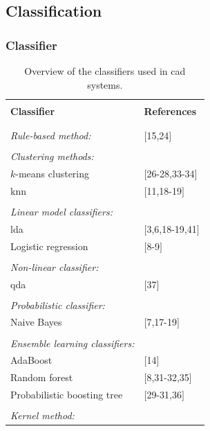 \subsection{Classification} \label{subsec:classification}

\subsubsection{Classifier}

\begin{table}
	\caption{Overview of the classifiers used in \ac{cad} systems.}
	\small
	\begin{tabular}{p{.60\linewidth} p{.30\linewidth}}
		\hline \\ [-1.5ex]
		\textbf{Classifier} & \textbf{References} \\ \\ [-1.5ex]
		\hline \\ [-1.5ex]
		\textit{Rule-based method:} & $[$15,24$]$ \\ \\ [-1.5ex]
		\textit{Clustering methods:} & \\
		\quad $k$-means clustering & $[$26-28,33-34$]$ \\
		\quad \acs{knn} & $[$11,18-19$]$ \\ \\ [-1.5ex]
		\textit{Linear model classifiers:} & \\
		\quad \acs{lda} & $[$3,6,18-19,41$]$ \\
		\quad Logistic regression & $[$8-9$]$ \\ \\ [-1.5ex]
		\textit{Non-linear classifier:} & \\
		\quad \acs{qda} & $[$37$]$ \\ \\ [-1.5ex]
		\textit{Probabilistic classifier:} & \\
		\quad Naive Bayes & $[$7,17-19$]$ \\ \\ [-1.5ex]
		\textit{Ensemble learning classifiers:} & \\
		\quad AdaBoost & $[$14$]$ \\
		\quad Random forest & $[$8,31-32,35$]$ \\
		\quad Probabilistic boosting tree & $[$29-31,36$]$ \\ \\ [-1.5ex]
		\textit{Kernel method:} & \\

\end{tabular}
\end{table}
